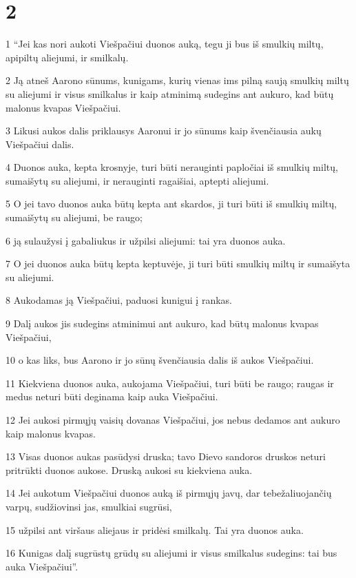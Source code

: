 \chapter{2}


\par 1 “Jei kas nori aukoti Viešpačiui duonos auką, tegu ji bus iš smulkių miltų, apipiltų aliejumi, ir smilkalų. 
\par 2 Ją atneš Aarono sūnums, kunigams, kurių vienas ims pilną saują smulkių miltų su aliejumi ir visus smilkalus ir kaip atminimą sudegins ant aukuro, kad būtų malonus kvapas Viešpačiui. 
\par 3 Likusi aukos dalis priklausys Aaronui ir jo sūnums kaip švenčiausia aukų Viešpačiui dalis. 
\par 4 Duonos auka, kepta krosnyje, turi būti nerauginti papločiai iš smulkių miltų, sumaišytų su aliejumi, ir nerauginti ragaišiai, aptepti aliejumi. 
\par 5 O jei tavo duonos auka būtų kepta ant skardos, ji turi būti iš smulkių miltų, sumaišytų su aliejumi, be raugo; 
\par 6 ją sulaužysi į gabaliukus ir užpilsi aliejumi: tai yra duonos auka. 
\par 7 O jei duonos auka būtų kepta keptuvėje, ji turi būti smulkių miltų ir sumaišyta su aliejumi. 
\par 8 Aukodamas ją Viešpačiui, paduosi kunigui į rankas. 
\par 9 Dalį aukos jis sudegins atminimui ant aukuro, kad būtų malonus kvapas Viešpačiui, 
\par 10 o kas liks, bus Aarono ir jo sūnų švenčiausia dalis iš aukos Viešpačiui. 
\par 11 Kiekviena duonos auka, aukojama Viešpačiui, turi būti be raugo; raugas ir medus neturi būti deginama kaip auka Viešpačiui. 
\par 12 Jei aukosi pirmųjų vaisių dovanas Viešpačiui, jos nebus dedamos ant aukuro kaip malonus kvapas. 
\par 13 Visas duonos aukas pasūdysi druska; tavo Dievo sandoros druskos neturi pritrūkti duonos aukose. Druską aukosi su kiekviena auka. 
\par 14 Jei aukotum Viešpačiui duonos auką iš pirmųjų javų, dar tebežaliuojančių varpų, sudžiovinsi jas, smulkiai sugrūsi, 
\par 15 užpilsi ant viršaus aliejaus ir pridėsi smilkalų. Tai yra duonos auka. 
\par 16 Kunigas dalį sugrūstų grūdų su aliejumi ir visus smilkalus sudegins: tai bus auka Viešpačiui”.



